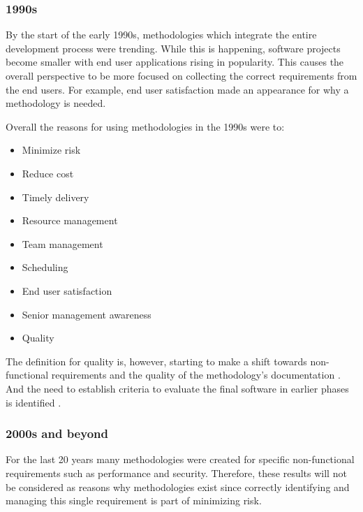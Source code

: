 \subsubsection{1990s}
By the start of the early 1990s, methodologies which integrate the entire development process were trending.
While this is happening, software projects become smaller with end user applications rising in popularity.
This causes the overall perspective to be more focused on collecting the correct requirements \cite{paul_1993} from the end users.
For example, end user satisfaction made an appearance for why a methodology is needed.
\cite{drake_1991}

Overall the reasons for using methodologies in the 1990s were to:
\begin{itemize}
    \item Minimize risk \cite{drake_1991, trussel_1999}
    \item Reduce cost \cite{drake_1991, scarre_1992, paul_1993}
    \item Timely delivery \cite{drake_1991, scarre_1992, herald_1993, trussel_1999}
    \item Resource management \cite{drake_1991}
    \item Team management \cite{drake_1991}
    \item Scheduling \cite{drake_1991, paul_1993}
    \item End user satisfaction \cite{drake_1991}
    \item Senior management awareness \cite{drake_1991}
    \item Quality \cite{drake_1991, scarre_1992, herald_1993, trussel_1999}
\end{itemize}

The definition for quality is, however, starting to make a shift towards non-functional requirements and the quality of the methodology's documentation \cite{scarre_1992}.
And the need to establish criteria to evaluate the final software in earlier phases is identified \cite{paul_1993, herald_1993, grossman_1997}.


\subsubsection{2000s and beyond}
For the last 20 years many methodologies were created for specific non-functional requirements such as performance and security.
Therefore, these results will not be considered as reasons why methodologies exist since correctly identifying and managing this single requirement is part of minimizing risk.

